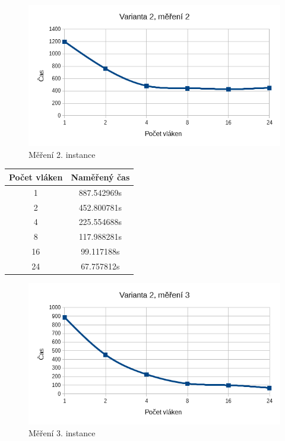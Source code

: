 \documentclass[12pt]{article}
\begin{document}
\begin{figure}
  \begin{center}
    \includegraphics[width=12cm]{images/sse2.png}
    \caption{Měření 2. instance} 
  \end{center}
\end{figure}

\begin{center}
\begin{tabular}{ c | c }
\textbf{Počet vláken} & \textbf{Naměřený čas} \\ \hline \hline 
1 & 887.542969s \\ \hline
2 & 452.800781s \\ \hline
4 & 225.554688s \\ \hline
8 & 117.988281s \\ \hline
16 & 99.117188s \\ \hline
24 & 67.757812s \\ \hline
\end{tabular}
\end{center}

\begin{figure}[H]
  \begin{center}
     \includegraphics[width=12cm]{images/sse3.png}
    \caption{Měření 3. instance} 
  \end{center}
\end{figure}
\end{document}
